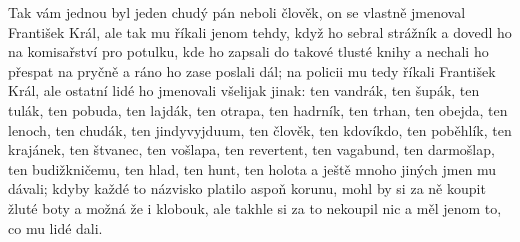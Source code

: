 Tak vám jednou byl jeden chudý pán neboli člověk, on se vlastně jmenoval
František Král, ale tak mu říkali jenom tehdy, když ho sebral strážník a
dovedl ho na komisařství pro potulku, kde ho zapsali do takové tlusté knihy
a nechali ho přespat na pryčně a ráno ho zase poslali dál; na policii mu
tedy říkali František Král, ale ostatní lidé ho jmenovali všelijak jinak:
ten vandrák, ten šupák, ten tulák, ten pobuda, ten lajdák, ten otrapa, ten
hadrník, ten trhan, ten obejda, ten lenoch, ten chudák, ten jindyvyjduum,
ten člověk, ten kdovíkdo, ten poběhlík, ten krajánek, ten štvanec, ten
vošlapa, ten revertent, ten vagabund, ten darmošlap, ten budižkničemu, ten
hlad, ten hunt, ten holota a ještě mnoho jiných jmen mu dávali; kdyby každé
to názvisko platilo aspoň korunu, mohl by si za ně koupit žluté boty a možná
že i klobouk, ale takhle si za to nekoupil nic a měl jenom to, co mu lidé
dali. 

